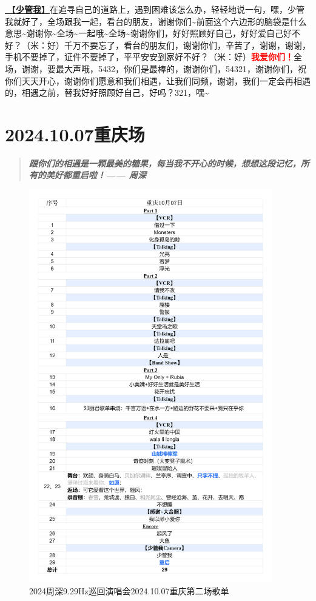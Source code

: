 \documentclass[]{ctexbook}
\begin{document}
\hyperref[watch-ur-manners]{🎵【\textbf{少管我}】}在追寻自己的道路上，遇到困难该怎么办，轻轻地说一句，嘿，少管我就好了，全场跟我一起，看台的朋友，谢谢你们\textasciitilde 前面这个六边形的脑袋是什么意思\textasciitilde 谢谢你\textasciitilde 全场\textasciitilde 一起哦\textasciitilde 全场\textasciitilde 谢谢你们，好好照顾好自己，好好爱自己好不好？（米：好）千万不要忘了，看台的朋友们，谢谢你们，辛苦了，谢谢，谢谢，手机不要掉了，证件不要掉了，平平安安到家好不好？（米：好）\textbf{\textcolor{red}{我爱你们！}}全场，谢谢，要最大声哦，5432，你们是最棒的，谢谢你们，54321，谢谢你们，祝你们天天开心，谢谢你们愿意和我们相遇，让我们同频，谢谢，我们一定会再相遇的，相遇之前，替我好好照顾好自己，好吗？321，嘿\textasciitilde{}

\chapter{2024.10.07重庆场}\label{chongqing-20241007}

\begin{quote}
\textbf{\emph{跟你们的相遇是一颗最美的糖果，每当我不开心的时候，想想这段记忆，所有的美好都重启啦！------ 周深}}
\end{quote}

\begin{figure}

{\centering \includegraphics[width=300pt]{img/playlists/playlists-chongqing-20241007} 

}

\caption{2024周深9.29Hz巡回演唱会2024.10.07重庆第二场歌单}\label{fig:unnamed-chunk-119}
\end{figure}
\end{document}
